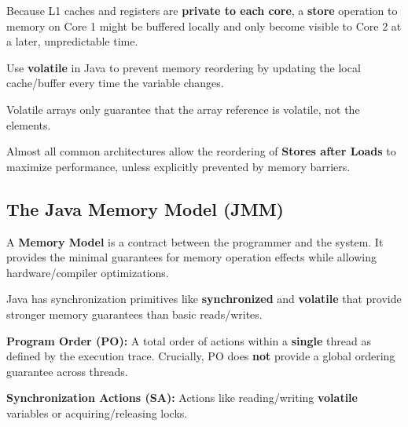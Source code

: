 \begin{remark}
    Because L1 caches and registers are \textbf{private to each core}, a \textbf{store} operation to memory on Core 1 might be buffered locally and only become visible to Core 2 at a later, unpredictable time.
\end{remark}

\begin{remark}
    Use \textbf{volatile} in Java to prevent memory reordering by updating the local cache/buffer every time the variable changes.
\end{remark}

\begin{important}
    Volatile arrays only guarantee that the array reference is volatile, not the elements. 
\end{important}

\begin{remark}
   Almost all common architectures allow the reordering of \textbf{Stores after Loads} to maximize performance, unless explicitly prevented by memory barriers.
\end{remark}

\subsection{The Java Memory Model (JMM)}

\begin{definition} 
    A \textbf{Memory Model} is a contract between the programmer and the system. It provides the minimal guarantees for memory operation effects while allowing hardware/compiler optimizations.
\end{definition}

\begin{remark}
    Java has synchronization primitives like \textbf{synchronized} and \textbf{volatile} that provide stronger memory guarantees than basic reads/writes.
\end{remark}

\begin{definition} 
    \textbf{Program Order (PO):} A total order of actions within a \textbf{single} thread as defined by the execution trace. Crucially, PO does \textbf{not} provide a global ordering guarantee across threads.
\end{definition}

\begin{definition} 
    \textbf{Synchronization Actions (SA):} Actions like reading/writing \textbf{volatile} variables or acquiring/releasing locks.
\end{definition}

